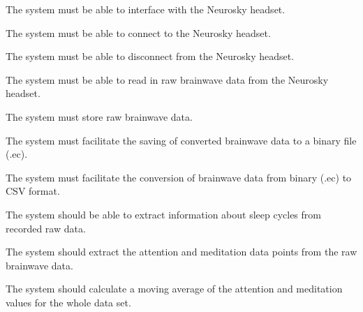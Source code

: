 \begin{reqtable}

  \reqheader

  {The system must be able to interface with the Neurosky headset.}
  \phigh
  \deps{\ref{sreq:connect-headset}, \ref{sreq:disconnect-headset}, \ref{sreq:read-data-headset}}

  {The system must be able to connect to the Neurosky headset.}
  \phigh
  \dnone

  {The system must be able to disconnect from the Neurosky headset.}
  \phigh
  \deps{\ref{sreq:connect-headset}}

  {The system must be able to read in raw brainwave data from the Neurosky headset.}
  \phigh
  \deps{\ref{sreq:connect-headset}}

  {The system must store raw brainwave data.}
  \phigh
  \deps{\ref{sreq:facilitate-saving}, \ref{sreq:facilitate-conversion}}

  {The system must facilitate the saving of converted brainwave data to a binary file (.ec).}
  \phigh
  \deps{\ref{sreq:read-data-headset}}

  {The system must facilitate the conversion of brainwave data from binary (.ec) to CSV format.}
  \phigh
  \deps{\ref{sreq:facilitate-saving}}

  {The system should be able to extract information about sleep cycles from recorded raw data.}
  \phigh
  \deps{\ref{sreq:extract-attention-meditation}, \ref{sreq:calculate-moving-average}}

  {The system should extract the attention and meditation data points from the raw brainwave data.}
  \phigh
  \deps{\ref{req:store-data}}

  {The system should calculate a moving average of the attention and meditation values for the whole
    data set.}
  \phigh
  \deps{\ref{sreq:extract-attention-meditation}}


\end{reqtable}
